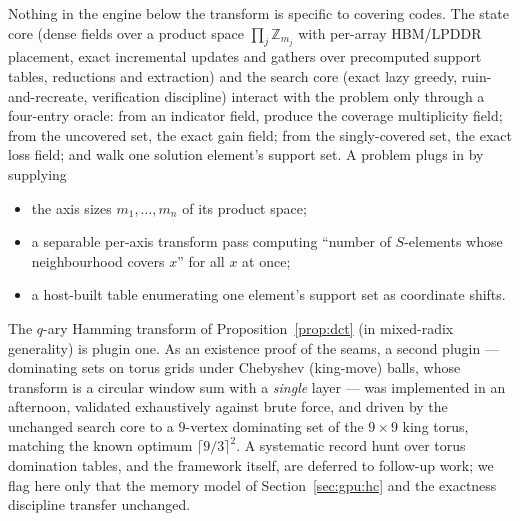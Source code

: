 Nothing in the engine below the transform is specific to covering codes.
The state core (dense fields over a product space
$\prod_j \mathbb{Z}_{m_j}$ with per-array HBM/LPDDR placement, exact
incremental updates and gathers over precomputed support tables,
reductions and extraction) and the search core (exact lazy greedy,
ruin-and-recreate, verification discipline) interact with the problem
only through a four-entry oracle: from an indicator field, produce the
coverage multiplicity field; from the uncovered set, the exact gain
field; from the singly-covered set, the exact loss field; and walk one
solution element's support set. A problem plugs in by supplying
\begin{itemize}
\item the axis sizes $m_1,\dots,m_n$ of its product space;
\item a separable per-axis transform pass computing ``number of
  $S$-elements whose neighbourhood covers $x$'' for all $x$ at once;
\item a host-built table enumerating one element's support set as
  coordinate shifts.
\end{itemize}
The $q$-ary Hamming transform of Proposition~\ref{prop:dct} (in mixed-radix
generality) is plugin one. As an existence proof of the seams, a second
plugin --- dominating sets on torus grids under Chebyshev (king-move)
balls, whose transform is a circular window sum with a \emph{single}
layer --- was implemented in an afternoon, validated exhaustively against
brute force, and driven by the unchanged search core to a $9$-vertex
dominating set of the $9\times 9$ king torus, matching the known optimum
$\lceil 9/3\rceil^2$. A systematic record hunt over torus domination
tables, and the framework itself, are deferred to follow-up work; we
flag here only that the memory model of Section~\ref{sec:gpu:hc} and the
exactness discipline transfer unchanged.
